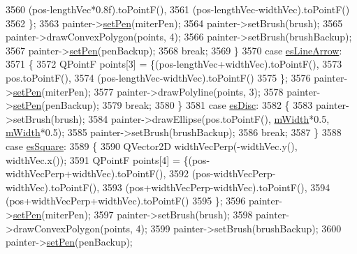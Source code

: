 \begin{DoxyCode}
3560                            (pos-lengthVec*0.8f).toPointF(),
3561                            (pos-lengthVec-widthVec).toPointF()
3562                           \};
3563       painter->\hyperlink{class_q_c_p_painter_af9c7a4cd1791403901f8c5b82a150195}{setPen}(miterPen);
3564       painter->setBrush(brush);
3565       painter->drawConvexPolygon(points, 4);
3566       painter->setBrush(brushBackup);
3567       painter->\hyperlink{class_q_c_p_painter_af9c7a4cd1791403901f8c5b82a150195}{setPen}(penBackup);
3568       \textcolor{keywordflow}{break};
3569     \}
3570     \textcolor{keywordflow}{case} \hyperlink{class_q_c_p_line_ending_a5ef16e6876b4b74959c7261d8d4c2cd5a61f78ee8f375fb21cb9d250687bbcbd2}{esLineArrow}:
3571     \{
3572       QPointF points[3] = \{(pos-lengthVec+widthVec).toPointF(),
3573                            pos.toPointF(),
3574                            (pos-lengthVec-widthVec).toPointF()
3575                           \};
3576       painter->\hyperlink{class_q_c_p_painter_af9c7a4cd1791403901f8c5b82a150195}{setPen}(miterPen);
3577       painter->drawPolyline(points, 3);
3578       painter->\hyperlink{class_q_c_p_painter_af9c7a4cd1791403901f8c5b82a150195}{setPen}(penBackup);
3579       \textcolor{keywordflow}{break};
3580     \}
3581     \textcolor{keywordflow}{case} \hyperlink{class_q_c_p_line_ending_a5ef16e6876b4b74959c7261d8d4c2cd5ae5a3414916817258bcc6dddd605e8f5c}{esDisc}:
3582     \{
3583       painter->setBrush(brush);
3584       painter->drawEllipse(pos.toPointF(),  \hyperlink{class_q_c_p_line_ending_aca89d21341133c20dc6825c33a5eac48}{mWidth}*0.5, \hyperlink{class_q_c_p_line_ending_aca89d21341133c20dc6825c33a5eac48}{mWidth}*0.5);
3585       painter->setBrush(brushBackup);
3586       \textcolor{keywordflow}{break};
3587     \}
3588     \textcolor{keywordflow}{case} \hyperlink{class_q_c_p_line_ending_a5ef16e6876b4b74959c7261d8d4c2cd5ae1836502fa43d8990bb62b2d493a140a}{esSquare}:
3589     \{
3590       QVector2D widthVecPerp(-widthVec.y(), widthVec.x());
3591       QPointF points[4] = \{(pos-widthVecPerp+widthVec).toPointF(),
3592                            (pos-widthVecPerp-widthVec).toPointF(),
3593                            (pos+widthVecPerp-widthVec).toPointF(),
3594                            (pos+widthVecPerp+widthVec).toPointF()
3595                           \};
3596       painter->\hyperlink{class_q_c_p_painter_af9c7a4cd1791403901f8c5b82a150195}{setPen}(miterPen);
3597       painter->setBrush(brush);
3598       painter->drawConvexPolygon(points, 4);
3599       painter->setBrush(brushBackup);
3600       painter->\hyperlink{class_q_c_p_painter_af9c7a4cd1791403901f8c5b82a150195}{setPen}(penBackup);

\end{DoxyCode}
